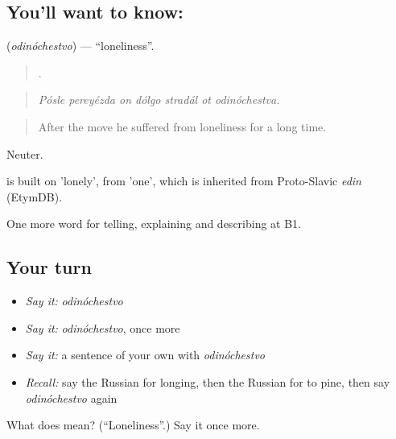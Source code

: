 \subsection*{You'll want to know: }
\textbf{} (\emph{odinóchestvo}) — \textquotedblleft{}loneliness\textquotedblright{}.

\begin{quote}
      .
\end{quote}

\begin{quote}
\emph{Pósle pereyézda on dólgo stradál ot odinóchestva.}
\end{quote}

\begin{quote}
After the move he suffered from loneliness for a long time.
\end{quote}

Neuter.

\begin{cousinweb}
\emph{} is built on \emph{} 'lonely', from \emph{} 'one', which is inherited from Proto-Slavic \emph{edin} (EtymDB).
\end{cousinweb}

\begin{grammarlens}[title={What you've built}]
One more word for telling, explaining and describing at B1.
\end{grammarlens}

\subsection*{Your turn}
\begin{itemize}
\raggedright
  \item \emph{Say it:} \emph{odinóchestvo}
  \item \emph{Say it:} \emph{odinóchestvo}, once more
  \item \emph{Say it:} a sentence of your own with \emph{odinóchestvo}
  \item \emph{Recall:} say the Russian for longing, then the Russian for to pine, then say \emph{odinóchestvo} again
\end{itemize}

\begin{tcolorbox}[breakable,colback=teal!4,colframe=teal!35!black,title={Before you move on}]
What does  mean? (\textquotedblleft{}Loneliness\textquotedblright{}.) Say it once more.
\end{tcolorbox}
